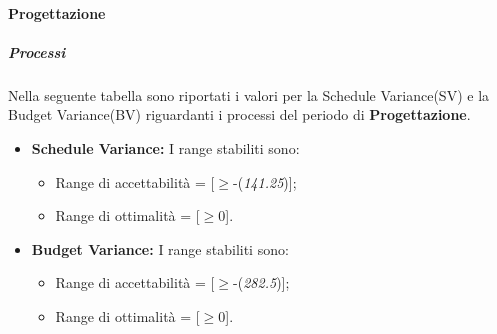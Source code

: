     \paragraph{Progettazione}
      \subparagraph{Processi}
      Nella seguente tabella sono riportati i valori per la Schedule Variance(SV) e la Budget Variance(BV) riguardanti i processi del periodo di \textbf{Progettazione}.\\
      \begin{itemize}
      \item \textbf{Schedule Variance:} I range stabiliti sono:
      \begin{itemize}
        \item Range di accettabilità = [\(\geq\)-(\emph{141.25})];
        \item Range di ottimalità = [\(\geq\)0].
      \end{itemize}
      
      \item \textbf{Budget Variance:} I range stabiliti sono:
      \begin{itemize}
        \item Range di accettabilità = [\(\geq\)-(\emph{282.5})];
        \item Range di ottimalità = [\(\geq\)0].
      \end{itemize}
      
      
      \end{itemize}
     

